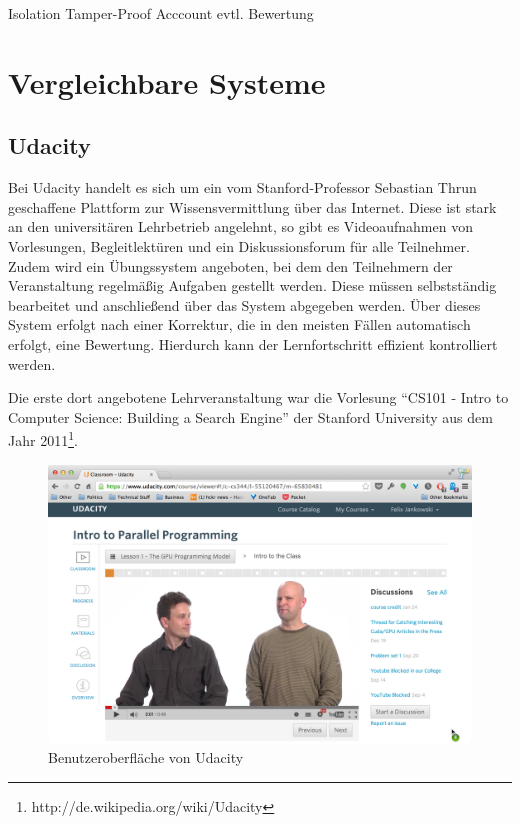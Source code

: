 		Isolation
		Tamper-Proof
		Acccount
		evtl. Bewertung

	

\section{Vergleichbare Systeme}
\label{sec:solutions}
		
		\subsection{Udacity}

			Bei Udacity handelt es sich um ein vom Stanford-Professor Sebastian Thrun geschaffene Plattform zur Wissensvermittlung über das Internet.
			Diese ist stark an den universitären Lehrbetrieb angelehnt, so gibt es Videoaufnahmen von Vorlesungen, Begleitlektüren und ein Diskussionsforum für alle Teilnehmer. 
			Zudem wird ein Übungssystem angeboten, bei dem den Teilnehmern der Veranstaltung regelmäßig Aufgaben gestellt werden. Diese müssen selbstständig bearbeitet und anschließend über das System abgegeben werden.
			Über dieses System erfolgt nach einer Korrektur, die in den meisten Fällen automatisch erfolgt, eine Bewertung.
			Hierdurch kann der Lernfortschritt effizient kontrolliert werden. %

			Die erste dort angebotene Lehrveranstaltung war die Vorlesung "`CS101 - Intro to Computer Science: Building a Search Engine"' der Stanford University aus dem Jahr 2011\footnote{http://de.wikipedia.org/wiki/Udacity}.


			\begin{figure}[h]
				\begin{center}
					\includegraphics[width=\textwidth]{img/udacity}
					\caption{Benutzeroberfläche von Udacity}
					\label{fig:screenshot-udacity}
				\end{center}
			\end{figure}


